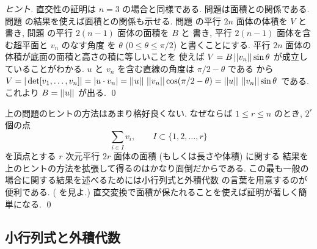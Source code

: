 \documentclass[12pt,twoside]{jarticle}
\begin{document}
\begin{proof}[ヒント]
  直交性の証明は $n=3$ の場合と同様である.
  問題は面積との関係である. 
  問題  の結果を使えば面積との関係も示せる.
  問題  の平行 $2n$ 面体の体積を $V$ と書き, 
  問題  の平行 $2(n-1)$ 面体の面積を $B$ と
  書き, 平行 $2(n-1)$ 面体を含む超平面と $v_n$ のなす角度
  を $\theta$ ($0\le\theta\le\pi/2$) と書くことにする. 
  平行 $2n$ 面体の体積が底面の面積と高さの積に等しいことを
  使えば $V=B\left|\left|v_n\right|\right|\sin\theta$ が成立していることがわかる.
  $u$ と $v_n$ を含む直線の角度は $\pi/2-\theta$ である
  から $V = |\det[v_1,\ldots,v_n]|=|u\cdot v_n|
  =\left|\left|u\right|\right|\,\left|\left|v_n\right|\right|\cos(\pi/2-\theta)
  =\left|\left|u\right|\right|\,\left|\left|v_n\right|\right|\sin\theta$ である. 
  これより $B=\left|\left|u\right|\right|$ が出る.
  \qed
\end{proof}

\begin{guide}
  上の問題のヒントの方法はあまり格好良くない.
  なぜならば $1\le r \le n$ のとき,  $2^r$ 個の点
  \begin{equation*}
    \sum_{i\in I} v_i, \qquad I\subset\{1,2,\ldots,r\}
  \end{equation*}
  を頂点とする $r$ 次元平行 $2r$ 面体の面積 (もしくは長さや体積) に関する
  結果を上のヒントの方法を拡張して得るのはかなり面倒だからである. 
  この最も一般の場合に関する結果を述べるためには小行列式と外積代数
  の言葉を用意するのが便利である.
  ( を見よ.)
  直交変換で面積が保たれることを使えば証明が著しく簡単になる.
  \qed
\end{guide}


\subsection{小行列式と外積代数}
\label{sec:minor}
\end{document}
